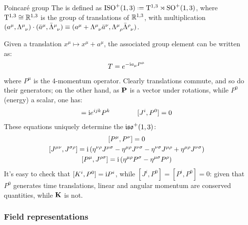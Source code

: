 \begin{definition}{Poincaré group}{}
  The  is defined as $ \pog \defeq \mathrm{T}^{1,3} \rtimes \lorg $, where $ \mathrm{T}^{1,3} \cong \mathbb{R}^{1,3} $ is the group of translations of $ \mathbb{R}^{1,3} $, with multiplication $ (a^\mu, \tensor{\Lambda}{^\mu_\nu}) \cdot (\bar{a}^\mu, \tensor{\bar{\Lambda}}{^\mu_\nu}) \equiv (a^\mu + \tensor{\Lambda}{^\mu_\nu} \bar{a}^\nu, \tensor{\Lambda}{^\mu_\rho} \tensor{\bar{\Lambda}}{^\rho_\nu}) $.
\end{definition}

Given a translation $ x^\mu \mapsto x^\mu + a^\mu $, the associated group element can be written as:
\begin{equation}
  T = e^{-\mathrm{i} a_\mu P^\mu}
\end{equation}
where $ P^\mu $ is the 4-momentum operator. Clearly translations commute, and so do their generators; on the other hand, as $ \mathbf{P} $ is a vector under rotations, while $ P^0 $ (energy) a scalar, one has:
\begin{equation*}
  [J^i,P^j] = \img e^{ijk} P^k
  \qquad \qquad
  [J^i,P^0] = 0
\end{equation*}
These equations uniquely determine the  $ \mathfrak{iso}^+(1,3) $:
\begin{equation}
  \begin{gathered}
    [P^\mu,P^\nu] = 0 \\
    [J^{\mu \nu}, J^{\sigma \rho}] = \img \left( \eta^{\nu \rho} J^{\mu \sigma} - \eta^{\mu \rho} J^{\nu \sigma} - \eta^{\nu \sigma} J^{\mu \rho} + \eta^{\mu \rho} J^{\nu \sigma} \right) \\
    [P^\mu,J^{\rho \sigma}] = \img \left( \eta^{\mu \rho} P^\sigma - \eta^{\mu \sigma} P^\rho \right)
  \end{gathered}
\end{equation}
It's easy to check that $ [K^i,P^0] = \mathrm{i} P^i $, while $ [J^i,P^0] = [P^i,P^0] = 0 $: given that $ P^0 $ generates time translations, linear and angular momentum are conserved quantities, while $ \mathbf{K} $ is not.

\subsubsection{Field representations}

